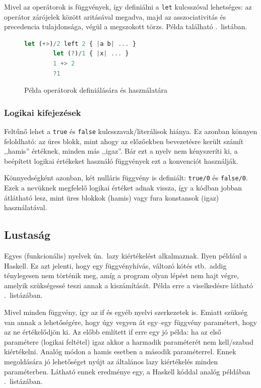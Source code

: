 \documentclass[magyar,12pt,a4paper,final,titlepage]{report}
\def\inlcode#1{{\color{inline-code-color}\tt #1}}
\def\un{ún.\ }
\begin{document}
    Mivel az operátorok is függvények, így definiálni a \inlcode{let} kulcsszóval lehetséges:
    az operátor zárójelek között aritásával megadva, majd az asszociativitás és precedencia tulajdonsága, végül a megszokott törzs.
    Példa található .~listában.

    \begin{figure}
        \begin{lstlisting}[gobble=8,language=haskell]
        let (+>)/2 left 2 { |a b| ... }
        let (?)/1 { |x| ... }
        1 +> 2
        ?1
        \end{lstlisting}
        \caption{Példa operátorok definiálására és használatára}\label{lst:ops}
    \end{figure}

    \subsubsection{Logikai kifejezések}

    Feltűnő lehet a \inlcode{true} és \inlcode{false} kulcsszavak/literálisok hiánya.
    Ez azonban könnyen feloldható: az üres blokk, mint ahogy az előzőekben bevezetésre került számít ,,hamis'' értéknek, minden más ,,igaz''.
    Bár ezt a nyelv nem kényszeríti ki, a beépített logikai értékeket használó függvények ezt a konvenciót használják.

    Könnyedségként azonban, két nulláris függvény is definiált: \inlcode{true/0} és \inlcode{false/0}.
    Ezek a nevüknek megfelelő logikai értéket adnak vissza, így a kódban jobban átlátható lesz, mint üres blokkok (hamis) vagy fura konstansok (igaz) használatával.

    \subsection{Lustaság}

    Egyes (funkcionális) nyelvek \un \gls{lazy} kiértékelést alkalmaznak.
    Ilyen például a Haskell.
    Ez azt jelenti, hogy egy függvényhívás, változó kötés stb.\ addig ténylegesen nem történik meg, amíg a program olyan lépést nem hajt végre, amelyik szükségessé teszi annak a kiszámítását.
    Példa erre a viselkedésre látható .~listázában.

    Mivel minden függvény, így az if és egyéb nyelvi szerkezetek is.
    Emiatt szükség van annak a lehetőségére, hogy úgy vegyen át egy--egy függvény paramétert, hogy az ne értékelődjön ki.
    Az előbb említett if erre egy jó példa: ha az első paramétere (logikai feltétel) igaz akkor a harmadik paraméterét nem kell/szabad kiértékelni.
    Analóg módon a hamis esetben a második paraméterrel.
    Ennek megoldására jó lehetőséget nyújt az általános \gls{lazy} kiértékelés minden paraméterben.
    Látható ennek eredménye egy, a Haskell kóddal analóg példában .~listázában.
\end{document}
